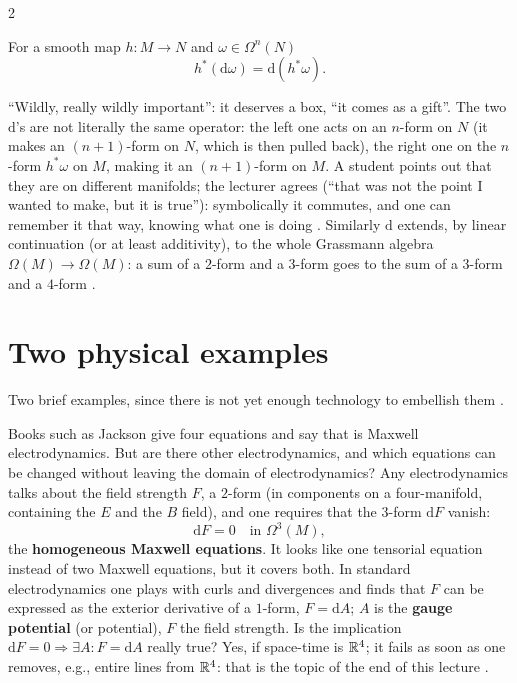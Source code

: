 \begin{paracol}{2}
\begin{theorem}\label{thm:gr-pullback-d}
For a smooth map $h\colon M\to N$ and $\omega\in\Omega^n(N)$
\[
  h^*(\mathrm d\omega)=\mathrm d(h^*\omega).
\]
   
\end{theorem}
``Wildly, really wildly important'': it deserves a box, ``it comes as a gift''. The two $\mathrm d$'s are not literally the same operator: the left one acts on an $n$-form on $N$ (it makes an $(n+1)$-form on $N$, which is then pulled back), the right one on the $n$-form $h^*\omega$ on $M$, making it an $(n+1)$-form on $M$. A student points out that they are on different manifolds; the lecturer agrees
(``that was not the point I wanted to make, but it is true''): symbolically it commutes, and one can remember it that way, knowing what one is doing      .
Similarly $\mathrm d$ extends, by linear continuation (or at least additivity), to the whole Grassmann algebra $\Omega(M)\to\Omega(M)$: a sum of a $2$-form and a $3$-form goes to the sum of a $3$-form and a $4$-form   .

\section{Two physical examples}\label{sec:gr-examples}

Two brief examples, since there is not yet enough technology to embellish them  .

\begin{example}\label{ex:gr-maxwell}
Books such as Jackson give four equations and say that is Maxwell electrodynamics. But are there other electrodynamics, and which equations can be changed without leaving the domain of electrodynamics? Any electrodynamics talks about the field strength $F$, a $2$-form (in components on a four-manifold, containing the $E$ and the $B$ field), and one requires that the $3$-form $\mathrm dF$ vanish:
\[
  \mathrm dF=0\quad\text{in }\Omega^3(M),
\]
the \textbf{homogeneous Maxwell equations}. It looks like one tensorial equation instead of two Maxwell equations, but it covers both. In standard electrodynamics one plays with curls and divergences and finds that $F$ can be expressed as the exterior derivative of a $1$-form, $F=\mathrm dA$; $A$ is the \textbf{gauge potential} (or potential), $F$ the field strength. Is the implication
$\mathrm dF=0\Rightarrow\exists A\colon F=\mathrm dA$ really true? Yes, if space-time is $\mathbb{R}^4$; it fails as soon as one removes, e.g., entire lines from $\mathbb{R}^4$: that is the topic of the end of this lecture          .
\end{example}


\end{paracol}
